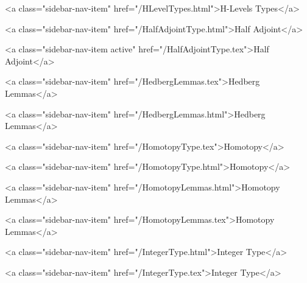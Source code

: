       
        
          <a class="sidebar-nav-item" href="/HLevelTypes.html">H-Levels Types</a>
        
      
    
      
        
          <a class="sidebar-nav-item" href="/HalfAdjointType.html">Half Adjoint</a>
        
      
    
      
        
          <a class="sidebar-nav-item active" href="/HalfAdjointType.tex">Half Adjoint</a>
        
      
    
      
        
          <a class="sidebar-nav-item" href="/HedbergLemmas.tex">Hedberg Lemmas</a>
        
      
    
      
        
          <a class="sidebar-nav-item" href="/HedbergLemmas.html">Hedberg Lemmas</a>
        
      
    
      
        
          <a class="sidebar-nav-item" href="/HomotopyType.tex">Homotopy</a>
        
      
    
      
        
          <a class="sidebar-nav-item" href="/HomotopyType.html">Homotopy</a>
        
      
    
      
        
          <a class="sidebar-nav-item" href="/HomotopyLemmas.html">Homotopy Lemmas</a>
        
      
    
      
        
          <a class="sidebar-nav-item" href="/HomotopyLemmas.tex">Homotopy Lemmas</a>
        
      
    
      
        
          <a class="sidebar-nav-item" href="/IntegerType.html">Integer Type</a>
        
      
    
      
        
          <a class="sidebar-nav-item" href="/IntegerType.tex">Integer Type</a>
        
      
    
